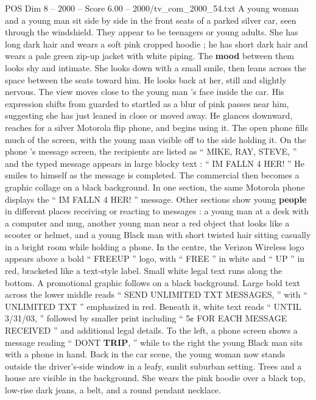 \begin{textsample}{POS Dim 8 – 2000 – Score 6.00 – 2000/tv\_com\_2000\_54.txt}  \label{ex:f8_pos_020}
A young woman and a young man sit side by side in the front seats of a parked silver car, seen through the windshield.
They appear to be teenagers or young adults.
She has long dark hair and wears a soft pink cropped hoodie ; he has short dark hair and wears a pale green zip-up jacket with white piping.
The \textbf{mood} between them looks shy and intimate.
She looks down with a small smile, then leans across the space between the seats toward him.
He looks back at her, still and slightly nervous.
The view moves close to the young man ’s face inside the car.
His expression shifts from guarded to startled as a blur of pink passes near him, suggesting she has just leaned in close or moved away.
He glances downward, reaches for a silver Motorola flip phone, and begins using it.
The open phone fills much of the screen, with the young man visible off to the side holding it.
On the phone ’s message screen, the recipients are listed as “ MIKE, RAY, STEVE, ” and the typed message appears in large blocky text : “ IM FALLN 4 HER! ” He smiles to himself as the message is completed.
The commercial then becomes a graphic collage on a black background.
In one section, the same Motorola phone displays the “ IM FALLN 4 HER! ” message.
Other sections show young \textbf{people} in different places receiving or reacting to messages : a young man at a desk with a computer and mug, another young man near a red object that looks like a scooter or helmet, and a young Black man with short twisted hair sitting casually in a bright room while holding a phone.
In the centre, the Verizon Wireless logo appears above a bold “ FREEUP ” logo, with “ FREE ” in white and “ UP ” in red, bracketed like a text-style label.
Small white legal text runs along the bottom.
A promotional graphic follows on a black background.
Large bold text across the lower middle reads “ SEND UNLIMITED TXT MESSAGES, ” with “ UNLIMITED TXT ” emphasized in red.
Beneath it, white text reads “ UNTIL 3/31/03, ” followed by smaller print including “ 5¢ FOR EACH MESSAGE RECEIVED ” and additional legal details.
To the left, a phone screen shows a message reading “ DONT \textbf{TRIP}, ” while to the right the young Black man sits with a phone in hand.
Back in the car scene, the young woman now stands outside the driver’s-side window in a leafy, sunlit suburban setting.
Trees and a house are visible in the background.
She wears the pink hoodie over a black top, low-rise dark jeans, a belt, and a round pendant necklace.

\end{textsample}
